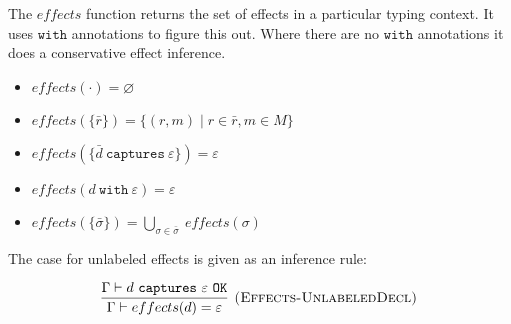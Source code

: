 \documentclass{llncs}
\newcommand{\keywadj}[1]{\mathtt{#1}}
\newcommand{\keyw}[1]{\keywadj{#1}~}
\begin{document}
The $effects$ function returns the set of effects in a particular typing context. It uses $\keywadj{with}$ annotations to figure this out. Where there are no $\keywadj{with}$ annotations it does a conservative effect inference.

\begin{itemize}
	\item $effects(\cdot) = \varnothing$
	\item $effects(\{\bar r\}) = \{ (r, m) \mid r \in \bar r, m \in M \}$
	\item $effects(\{ \bar d~\keyw{captures} \varepsilon \}) = \varepsilon$
	\item $effects(d~\keyw{with} \varepsilon) = \varepsilon$
	\item $effects(\{\bar \sigma\}) = \bigcup_{\sigma \in \bar \sigma}~effects(\sigma)$
\end{itemize}

The case for unlabeled effects is given as an inference rule:

\[
\begin{array}{c}
\infer[\textsc{(Effects-UnlabeledDecl)}]
	{\Gamma \vdash effects(d) = \varepsilon}
	{\Gamma \vdash d~\keyw{captures} \varepsilon~\keywadj{OK}} \\[5ex]
\end{array}
\]
\end{document}
